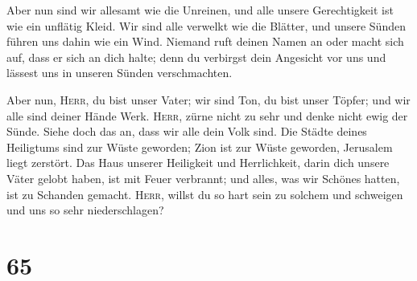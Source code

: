  Aber nun sind wir allesamt wie die Unreinen, und alle
unsere Gerechtigkeit ist wie ein unflätig Kleid. Wir sind alle verwelkt
wie die Blätter, und unsere Sünden führen uns dahin wie ein Wind.
 Niemand ruft deinen Namen an oder macht sich auf, dass er
sich an dich halte; denn du verbirgst dein Angesicht vor uns und lässest
uns in unseren Sünden verschmachten.

 Aber nun, \textsc{Herr}, du bist unser Vater; wir sind
Ton, du bist unser Töpfer; und wir alle sind deiner Hände Werk.
 \textsc{Herr}, zürne nicht zu sehr und denke nicht ewig
der Sünde. Siehe doch das an, dass wir alle dein Volk sind.
 Die Städte deines Heiligtums sind zur Wüste geworden;
Zion ist zur Wüste geworden, Jerusalem liegt zerstört. 
Das Haus unserer Heiligkeit und Herrlichkeit, darin dich unsere Väter
gelobt haben, ist mit Feuer verbrannt; und alles, was wir Schönes
hatten, ist zu Schanden gemacht.  \textsc{Herr}, willst
du so hart sein zu solchem und schweigen und uns so sehr niederschlagen?

\hypertarget{section-64}{%
\section{65}\label{section-64}}

